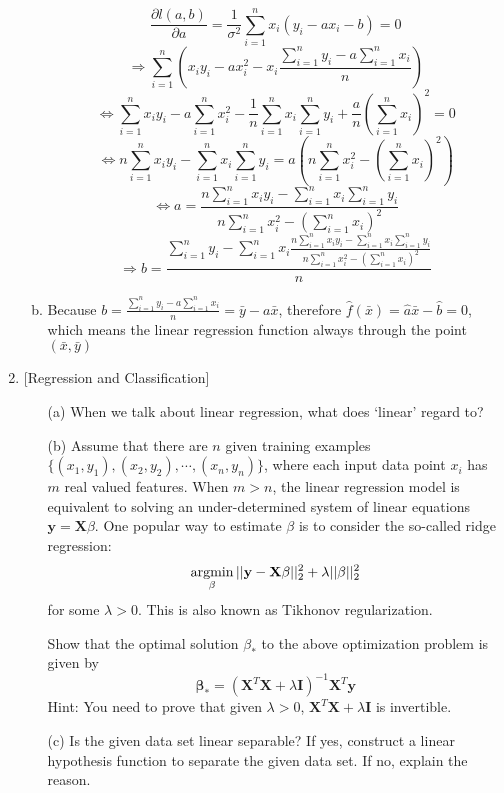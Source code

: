 \documentclass[10pt]{article}
\begin{document}
\begin{enumerate}[1.]
\begin{enumerate}[(a)]
		$$\frac{\partial l(a,b)}{\partial a}=\frac{1}{\sigma^2}\sum_{i=1}^{n}x_i(y_i-ax_i-b)=0$$
		$$\Rightarrow\sum_{i=1}^{n}(x_iy_i-ax_i^2-x_i\frac{\sum_{i=1}^{n}y_i-a\sum_{i=1}^{n}x_i}{n})$$
		$$\Leftrightarrow\sum_{i=1}^{n}x_iy_i-a\sum_{i=1}^{n}x_i^2-\frac{1}{n}\sum_{i=1}^{n}x_i\sum_{i=1}^{n}y_i+\frac{a}{n}(\sum_{i=1}^{n}x_i)^2=0$$
		$$\Leftrightarrow n\sum_{i=1}^{n}x_iy_i-\sum_{i=1}^{n}x_i\sum_{i=1}^{n}y_i=a\left(n\sum_{i=1}^{n}x_i^2-(\sum_{i=1}^{n}x_i)^2\right)$$
		$$\Leftrightarrow a=\frac{n\sum_{i=1}^{n}x_iy_i-\sum_{i=1}^{n}x_i\sum_{i=1}^{n}y_i}{n\sum_{i=1}^{n}x_i^2-(\sum_{i=1}^{n}x_i)^2}$$
		$$\Rightarrow b=\frac{\sum_{i=1}^{n}y_i-\sum_{i=1}^{n}x_i\frac{n\sum_{i=1}^{n}x_iy_i-\sum_{i=1}^{n}x_i\sum_{i=1}^{n}y_i}{n\sum_{i=1}^{n}x_i^2-(\sum_{i=1}^{n}x_i)^2}}{n}$$
		\item 
		Because $b=\frac{\sum_{i=1}^{n}y_i-a\sum_{i=1}^{n}x_i}{n}=\bar y-a\bar x$, therefore $\hat f(\bar x)=\hat a\bar x-\hat b=0$, which means the linear regression function always through the point $(\bar x,\bar y)$
	\end{enumerate}
	\newpage

	\item {} [Regression and Classification]
		\begin{itemize}
		\item[(a)] When we talk about linear regression, what does `linear' regard to? 
		\item[(b)] Assume that there are $n$ given training examples $\{(x_1, y_1), (x_2, y_2), \cdots, (x_n, y_n)\}$,
		where each input data point $x_i$ has $m$ real valued features. When $m > n$, the linear regression model
		is equivalent to solving an under-determined system of linear equations $\mathbf{y} = \mathbf{X}\beta$. One popular way to
		estimate $\beta$ is to consider the so-called ridge regression:
		\[\mathop{\rm argmin}_{\beta} ||\mathbf{y}-\mathbf{X}\mathbf{\beta}||_2^2 + \lambda||\beta||_2^2\]
		for some $\lambda > 0$. This is also known as Tikhonov regularization.
		
		Show that the optimal solution $\beta_*$ to the above optimization problem is given by
		\[\mathbf{\beta}_* = (\mathbf{X}^T\mathbf{X} + \lambda \mathbf{I})^{-1}\mathbf{X}^T\mathbf{y}\]
		Hint: You need to prove that given $\lambda>0$, $\mathbf{X}^T\mathbf{X} + \lambda \mathbf{I}$ is invertible. 
		\item[(c)] Is the given data set linear separable? If yes, construct a linear hypothesis function to separate the given data set. If no, explain the reason. 
		

\end{itemize}
\end{enumerate}
\end{document}
